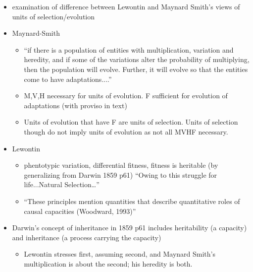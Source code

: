 \begin{itemize}
	\item
	
	examination of difference between Lewontin and Maynard Smith's views
	of units of selection/evolution
	
	\item
	
	Maynard-Smith
	
	
	\begin{itemize}
		\item
		
		``if there is a population of entities with multiplication,
		variation and heredity, and if some of the variations alter the
		probability of multiplying, then the population will evolve.
		Further, it will evolve so that the entities come to have
		adaptations....''
		
		\item
		
		M,V,H necessary for units of evolution. F sufficient for evolution
		of adaptations (with proviso in text)
		
		\item
		
		Units of evolution that have F are units of selection. Units of
		selection though do not imply units of evolution as not all MVHF
		necessary.
		
	\end{itemize}
	\item
	
	Lewontin
	
	
	\begin{itemize}
		\item
		
		phentotypic variation, differential fitness, fitness is heritable
		(by generalizing from Darwin 1859 p61) ``Owing to this struggle for
		life...Natural Selection\ldots{}''
		
		\item
		
		``These principles mention quantities that describe quantitative
		roles of causal capacities (Woodward, 1993)''
		
	\end{itemize}
	\item
	
	Darwin's concept of inheritance in 1859 p61 includes heritability (a
	capacity) and inheritance (a process carrying the capacity)
	
	
	\begin{itemize}
		\item
		
		Lewontin stresses first, assuming second, and Maynard Smith's
		multiplication is about the second; his heredity is both.
		
	\end{itemize}
\end{itemize}


